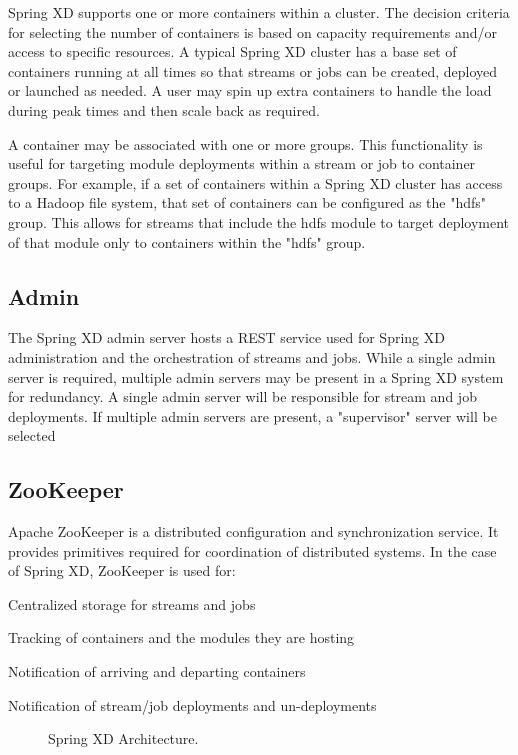 Spring XD supports one or more containers within a cluster. The decision criteria
for selecting the number of containers is based on capacity requirements and/or access
to specific resources.  A typical Spring XD cluster has a base set of containers
running at all times so that streams or jobs can be created, deployed or launched
as needed. A user may spin up extra containers to handle the load during peak times
and then scale back as required.

A container may be associated with one or more groups. This functionality is useful
for targeting module deployments within a stream or job to container groups.
For example, if a set of containers within a Spring XD cluster has access to
a Hadoop file system, that set of containers can be configured as the "hdfs" group.
This allows for streams that include the hdfs module to target deployment of
that module only to containers within the "hdfs" group.

\subsection{Admin}
\label{subsec:Admin}
The Spring XD admin server hosts a REST service used for Spring XD
administration and the orchestration of streams and jobs. While a single
admin server is required, multiple admin servers may be present in a Spring XD
system for redundancy. A single admin server will be responsible for stream
and job deployments. If multiple admin servers are present, a "supervisor"
server will be selected 

\subsection{ZooKeeper}
Apache ZooKeeper is a distributed configuration and synchronization service.
It provides primitives required for coordination of distributed systems.
In the case of Spring XD, ZooKeeper is used for: \begin{itemize*}
	\item Centralized storage for streams and jobs
	\item Tracking of containers and the modules they are hosting
	\item Notification of arriving and departing containers
	\item Notification of stream/job deployments and un-deployments
\end{itemize*}
\begin{figure}[ht]
\centering
{}
\caption{Spring XD Architecture.}
\label{fig:architecture}
\end{figure}

